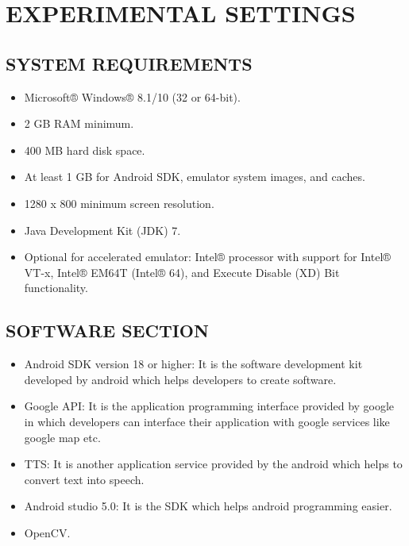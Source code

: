 \documentclass[11pt,a4paper]{report}
\begin{document}
\chapter{EXPERIMENTAL SETTINGS}
\section{SYSTEM REQUIREMENTS}
\begin{itemize}
\item Microsoft® Windows® 8.1/10 (32 or 64-bit).
\item 2 GB RAM minimum.
\item 400 MB hard disk space.
\item At least 1 GB for Android SDK, emulator system images, and caches.
\item 1280 x 800 minimum screen resolution.
\item Java Development Kit (JDK) 7.
\item Optional for accelerated emulator: Intel® processor with support for Intel® VT-x, Intel® EM64T (Intel® 64), and Execute Disable (XD) Bit functionality.

\end{itemize}
\section{SOFTWARE SECTION}
\begin{itemize}
\item Android SDK version 18 or higher: It is the software development kit developed
by android which helps developers to create software.
\item Google API: It is the application programming interface provided by google in
which developers can interface their application with google services like google
map etc.
\item TTS: It is another application service provided by the android which helps to
convert text into speech.
\item Android studio 5.0: It is the SDK which helps android programming easier.
\item OpenCV.
\end{itemize}
\end{document}
